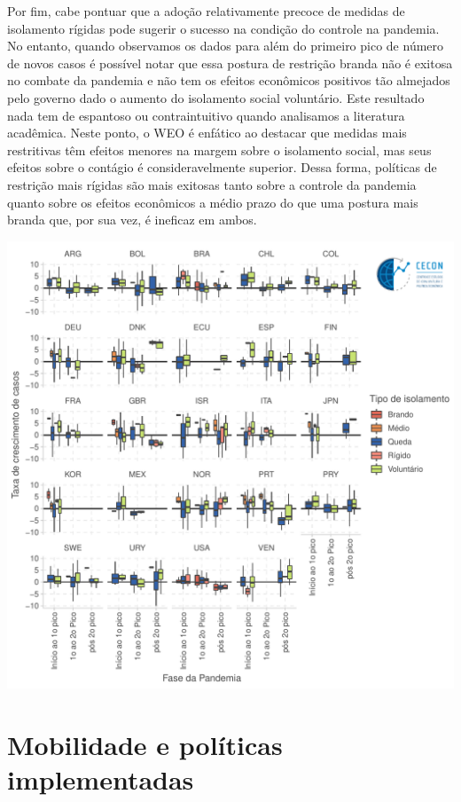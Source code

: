 \documentclass{SelfArx}
\begin{document}
Por fim, cabe pontuar que a adoção relativamente precoce de medidas de isolamento rígidas pode sugerir o sucesso na condição do controle na pandemia.
No entanto, quando observamos os dados para além do primeiro pico de número de novos casos é possível notar que essa postura de restrição branda não é exitosa no combate da pandemia e não tem os efeitos econômicos positivos tão almejados pelo governo dado o aumento do isolamento social voluntário.
Este resultado nada tem de espantoso ou contraintuitivo quando analisamos a literatura acadêmica.
Neste ponto, o WEO é enfático ao destacar que medidas mais restritivas têm efeitos menores na margem sobre o isolamento social, mas seus efeitos sobre o contágio é consideravelmente superior.
Dessa forma, políticas de restrição mais rígidas são mais exitosas tanto sobre a controle da pandemia quanto sobre os efeitos econômicos a médio prazo do que uma postura mais branda que, por sua vez, é ineficaz em ambos.

\begin{center}
\includegraphics[width=.9\linewidth]{./figs/COVID/Casos_Policy_LowHigh.pdf}
\end{center}

\section*{Mobilidade e políticas implementadas}
\label{sec:org4f19727}
\end{document}
